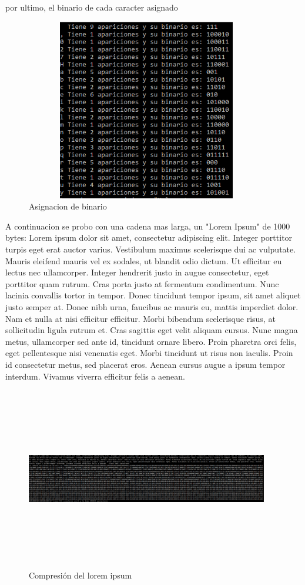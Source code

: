 \documentclass[spanish]{article}
\begin{document}
	por ultimo, el binario de cada caracter asignado
	\begin{figure}[H]
		\centering
		\includegraphics[width=400px,height=300px]{captura9}
		\caption{Asignacion de binario}
	\end{figure}
	A continuacion se probo con una cadena mas larga, un "Lorem Ipsum" de 1000 bytes:
	Lorem ipsum dolor sit amet, consectetur adipiscing elit. Integer porttitor turpis eget erat auctor varius. Vestibulum maximus scelerisque dui ac vulputate. Mauris eleifend mauris vel ex sodales, ut blandit odio dictum. Ut efficitur eu lectus nec ullamcorper. Integer hendrerit justo in augue consectetur, eget porttitor quam rutrum. Cras porta justo at fermentum condimentum. Nunc lacinia convallis tortor in tempor. Donec tincidunt tempor ipsum, sit amet aliquet justo semper at. Donec nibh urna, faucibus ac mauris eu, mattis imperdiet dolor. Nam et nulla at nisi efficitur efficitur. Morbi bibendum scelerisque risus, at sollicitudin ligula rutrum et. Cras sagittis eget velit aliquam cursus.
	Nunc magna metus, ullamcorper sed ante id, tincidunt ornare libero. Proin pharetra orci felis, eget pellentesque nisi venenatis eget. Morbi tincidunt ut risus non iaculis. Proin id consectetur metus, sed placerat eros. Aenean cursus augue a ipsum tempor interdum. Vivamus viverra efficitur felis a aenean. 
	\begin{figure}[H]
		\centering
		\includegraphics[width=400px,height=300px]{captura5}
		\caption{Compresión del lorem ipsum}
	\end{figure}
	
\end{document}
